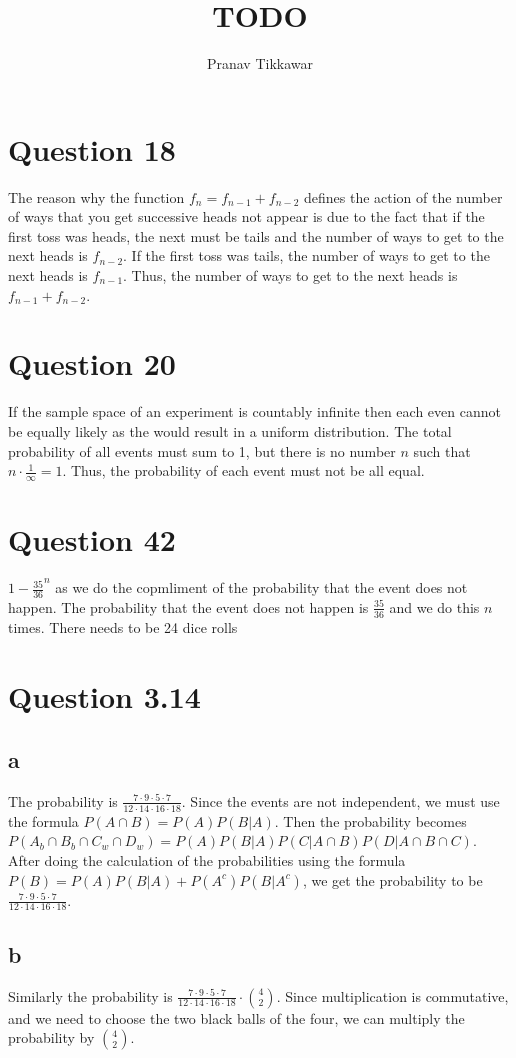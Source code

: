 \documentclass{article}
\author{Pranav Tikkawar}
\title{TODO}
\begin{document}
\maketitle
\section{Question 18}
The reason why the function $f_n = f_{n-1} + f_{n-2}$ defines the action of the number of ways that you get successive heads not appear is due to the fact that if the first toss was heads, the next must be tails and the number of ways to get to the next heads is $f_{n-2}$. If the first toss was tails, the number of ways to get to the next heads is $f_{n-1}$. Thus, the number of ways to get to the next heads is $f_{n-1} + f_{n-2}$.
\section{Question 20}
If the sample space of an experiment is countably infinite then each even cannot be equally likely as the would result in a uniform distribution. The total probability of all events must sum to 1, but there is no number $n$ such that $n \cdot \frac{1}{\infty} = 1$. Thus, the probability of each event must not be all equal. 

\section{Question 42}
$1-\frac{35}{36}^n$ as we do the copmliment of the probability that the event does not happen. The probability that the event does not happen is $\frac{35}{36}$ and we do this $n$ times. There needs to be 24 dice rolls

\section{Question 3.14}
\subsection*{a}
The probability is $\frac{7 \cdot 9 \cdot 5 \cdot 7}{12 \cdot 14 \cdot 16 \cdot 18}$. Since the events are not independent, we must use the formula $P(A \cap B) = P(A)P(B|A)$. Then the probability becomes $P(A_b \cap B_b \cap C_w \cap D_w) = P(A)P(B|A)P(C|A \cap B)P(D|A \cap B \cap C)$. After doing the calculation of the probabilities using the formula $P(B) = P(A)P(B|A) + P(A^c)P(B|A^c)$, we get the probability to be $\frac{7 \cdot 9 \cdot 5 \cdot 7}{12 \cdot 14 \cdot 16 \cdot 18}$.

\subsection*{b}
Similarly the probability is $\frac{7 \cdot 9 \cdot 5 \cdot 7}{12 \cdot 14 \cdot 16 \cdot 18} \cdot \binom{4}{2}$. Since multiplication is commutative, and we need to choose the two black balls of the four, we can multiply the probability by $\binom{4}{2}$.
\end{document}
